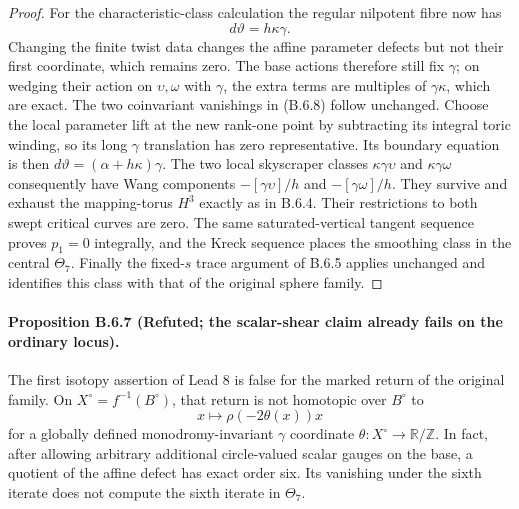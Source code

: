 \begin{proof}
For the characteristic-class calculation the regular nilpotent
fibre now has
\[
 d\vartheta=h\kappa\gamma.
\]
Changing the finite twist data changes the affine parameter
defects but not their first coordinate, which remains zero.
The base actions therefore still fix $\gamma$; on wedging
their action on $\upsilon,\omega$ with $\gamma$, the extra
terms are multiples of $\gamma\kappa$, which are exact.
The two coinvariant vanishings in (B.6.8) follow unchanged.
Choose the local parameter lift at the new rank-one point
by subtracting its integral toric winding, so its long
$\gamma$ translation has zero representative. Its boundary
equation is then
$d\vartheta=(\alpha+h\kappa)\gamma$.
The two local skyscraper classes $\kappa\gamma\upsilon$ and
$\kappa\gamma\omega$ consequently have Wang components
$-[\gamma\upsilon]/h$ and $-[\gamma\omega]/h$.
They survive and exhaust the mapping-torus $H^3$ exactly as
in B.6.4. Their restrictions to both swept critical curves
are zero. The same saturated-vertical tangent sequence proves
$p_1=0$ integrally, and the Kreck sequence places the smoothing
class in the central $\Theta_7$. Finally the fixed-$s$ trace
argument of B.6.5 applies unchanged and identifies this class
with that of the original sphere family.
\end{proof}

\paragraph{Proposition B.6.7 (Refuted; the scalar-shear claim already fails on the ordinary locus).}
The first isotopy assertion of Lead 8 is false for the marked
return of the original family. On $X^\circ=f^{-1}(B^\circ)$,
that return is not homotopic over $B^\circ$ to
\[
 x\longmapsto\rho(-2\theta(x))x
\]
for a globally defined monodromy-invariant $\gamma$ coordinate
$\theta:X^\circ\to\mathbb R/\mathbb Z$.
In fact, after allowing arbitrary additional circle-valued
scalar gauges on the base, a quotient of the affine defect
has exact order six. Its vanishing under the sixth iterate
does not compute the sixth iterate in $\Theta_7$.

